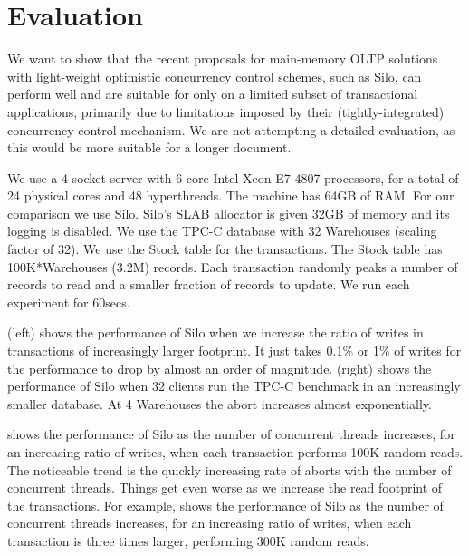 
\section{Evaluation}

We want to show that the recent proposals for main-memory OLTP solutions with light-weight optimistic concurrency control schemes, such as Silo, can perform well and are suitable for only on a limited subset of transactional applications, primarily due to limitations imposed by their (tightly-integrated) concurrency control mechanism.  We are not attempting a detailed evaluation, as this would be more suitable for a longer document.

We use a 4-socket server with 6-core Intel Xeon E7-4807 processors, for a total of 24 physical cores and 48 hyperthreads. The machine has 64GB of RAM. 
For our comparison we use Silo.  Silo's SLAB allocator is given 32GB of memory and its logging is disabled. We use the TPC-C database with 32 Warehouses (scaling factor of 32). We use the Stock table for the transactions.  The Stock table has 100K*Warehouses (3.2M) records. Each transaction randomly peaks a number of records to read and a smaller fraction of records to update.  We run each experiment for 60secs.

(left) shows the performance of Silo when we increase the ratio of writes in transactions of increasingly larger footprint. It just takes 0.1\% or 1\% of writes for the performance to drop by almost an order of magnitude.
(right) shows the performance of Silo when 32 clients run the TPC-C benchmark in an increasingly smaller database. At 4 Warehouses the abort increases almost exponentially.



 shows the performance of Silo as the number of concurrent threads increases, for an increasing ratio of writes, when each transaction performs 100K random reads.
The noticeable trend is the quickly increasing rate of aborts with the number of concurrent threads.
Things get even worse as we increase the read footprint of the transactions. For example,  shows the performance of Silo as the number of concurrent threads increases, for an increasing ratio of writes, when each transaction is three times larger, performing 300K random reads.




